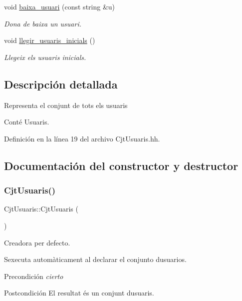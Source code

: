 \begin{DoxyCompactItemize}
void \mbox{\hyperlink{class_cjt_usuaris_a8aa977e92fd28d1c1dd1604ec3ed21e8}{baixa\+\_\+usuari}} (const string \&u)
\begin{DoxyCompactList}\small\item\em Dona de baixa un usuari. \end{DoxyCompactList}\item 
void \mbox{\hyperlink{class_cjt_usuaris_acb8d525b500b034d277c48197d16a682}{llegir\+\_\+usuaris\+\_\+inicials}} ()
\begin{DoxyCompactList}\small\item\em Llegeix els usuaris inicials. \end{DoxyCompactList}\end{DoxyCompactItemize}


\subsection{Descripción detallada}
Representa el conjunt de tots els usuaris

Conté Usuaris. 

Definición en la línea 19 del archivo Cjt\+Usuaris.\+hh.



\subsection{Documentación del constructor y destructor}
\mbox{\label{class_cjt_usuaris_a66bec1ef851247d1729414abcfcba4a6}} 
\subsubsection{\texorpdfstring{Cjt\+Usuaris()}{CjtUsuaris()}}
{\footnotesize\ttfamily Cjt\+Usuaris\+::\+Cjt\+Usuaris (\begin{DoxyParamCaption}{ }\end{DoxyParamCaption})}



Creadora per defecto. 

S\textquotesingle{}executa automàticament al declarar el conjunto d\textquotesingle{}usuarios. \begin{DoxyPrecond}{Precondición}
{\itshape cierto} 
\end{DoxyPrecond}
\begin{DoxyPostcond}{Postcondición}
El resultat és un conjunt d\textquotesingle{}usuaris. 
\end{DoxyPostcond}


